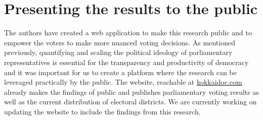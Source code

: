 \documentclass[final,5p,times,twocolumn,authoryear]{elsarticle}
\begin{document}
	

\FloatBarrier



\section{Presenting the results to the public}
\label{section: kokkaidoc}
The authors have created a web application to make this research public and to empower the voters to make more nuanced voting decisions. As mentioned previously, quantifying and scaling the political ideology of parliamentary representatives is essential for the transparency and productivity of democracy and it was important for us to create a platform where the research can be leveraged practically by the public. The website, reachable at \url{kokkaidoc.com} already makes the findings of \citeauthor{kato2024lupinllmbasedpoliticalideology} public and publishes parliamentary voting results as well as the current distribution of electoral districts. We are currently working on updating the website to include the findings from this research.
\end{document}
